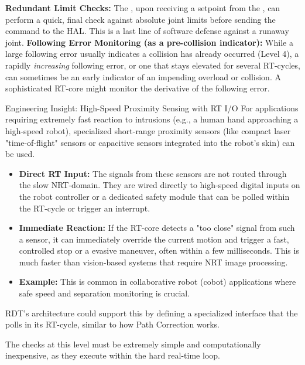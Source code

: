 \textbf{Redundant Limit Checks:} The , upon receiving a setpoint from the , can perform a quick, final check against absolute joint limits before sending the command to the HAL. This is a last line of software defense against a runaway joint.
\textbf{Following Error Monitoring (as a pre-collision indicator):} While a large following error usually indicates a collision has already occurred (Level 4), a rapidly \textit{increasing} following error, or one that stays elevated for several RT-cycles, can sometimes be an early indicator of an impending overload or collision. A sophisticated RT-core might monitor the derivative of the following error.
    \begin{tipbox}{Engineering Insight: High-Speed Proximity Sensing with RT I/O} %
For applications requiring extremely fast reaction to intrusions (e.g., a human hand approaching a high-speed robot), specialized short-range proximity sensors (like compact laser "time-of-flight" sensors or capacitive sensors integrated into the robot's skin) can be used.
\begin{itemize}
    \item \textbf{Direct RT Input:} The signals from these sensors are not routed through the slow NRT-domain. They are wired directly to high-speed digital inputs on the robot controller or a dedicated safety module that can be polled within the RT-cycle or trigger an interrupt.
    \item \textbf{Immediate Reaction:} If the RT-core detects a "too close" signal from such a sensor, it can immediately override the current motion and trigger a fast, controlled stop or a evasive maneuver, often within a few milliseconds. This is much faster than vision-based systems that require NRT image processing.
    \item \textbf{Example:} This is common in collaborative robot (cobot) applications where safe speed and separation monitoring is crucial.
\end{itemize}
\end{tipbox}
        RDT's architecture could support this by defining a specialized  interface that the  polls in its RT-cycle, similar to how Path Correction works.

The checks at this level must be extremely simple and computationally inexpensive, as they execute within the hard real-time loop.


